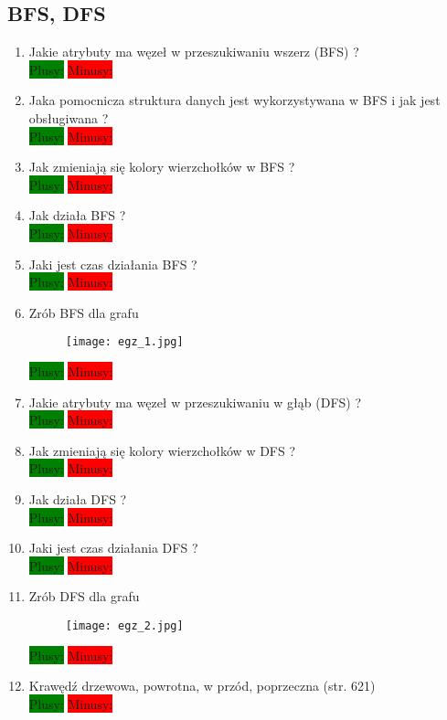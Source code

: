 \documentclass[a4paper,11pt]{article}
\begin{document}
\subsection{BFS, DFS}
\begin{enumerate}

\item Jakie atrybuty ma węzeł w przeszukiwaniu wszerz (BFS) ?
 \\ \colorbox{green}{Plusy:} \colorbox{red}{Minusy: } 
 
\item Jaka pomocnicza struktura danych jest wykorzystywana w BFS i jak jest obsługiwana ?
\\ \colorbox{green}{Plusy:} \colorbox{red}{Minusy: } 

\item Jak zmieniają się kolory wierzchołków w BFS ?
\\ \colorbox{green}{Plusy:} \colorbox{red}{Minusy: } 

\item Jak działa BFS ? 
\\ \colorbox{green}{Plusy:} \colorbox{red}{Minusy: } 

\item Jaki jest czas działania BFS ?
\\ \colorbox{green}{Plusy:} \colorbox{red}{Minusy: } 

\item Zrób BFS dla grafu 
\begin{figure}[H]
\texttt{[image: egz\_1.jpg]}
\end{figure}
\colorbox{green}{Plusy:} \colorbox{red}{Minusy: } 

\item Jakie atrybuty ma węzeł w przeszukiwaniu w głąb (DFS) ?
 \\ \colorbox{green}{Plusy:} \colorbox{red}{Minusy: }

\item Jak zmieniają się kolory wierzchołków w DFS ?
\\ \colorbox{green}{Plusy:} \colorbox{red}{Minusy: } 

\item Jak działa DFS ? 
\\ \colorbox{green}{Plusy:} \colorbox{red}{Minusy: } 

\item Jaki jest czas działania DFS ?
\\ \colorbox{green}{Plusy:} \colorbox{red}{Minusy: } 

\item Zrób DFS dla grafu 
\begin{figure}[H]
\texttt{[image: egz\_2.jpg]}
\end{figure}
\colorbox{green}{Plusy:} \colorbox{red}{Minusy: } 

\item Krawędź drzewowa, powrotna, w przód, poprzeczna (str. 621) \\
\colorbox{green}{Plusy:} \colorbox{red}{Minusy: } 

\end{enumerate}
\end{document}

